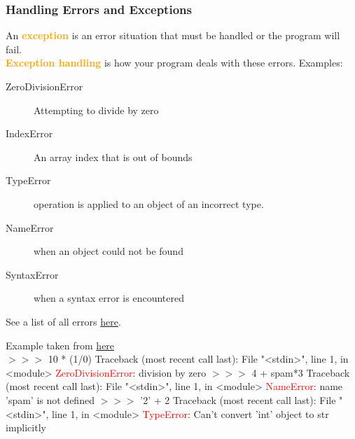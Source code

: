 \documentclass[xcolor=svgnames]{beamer}
\newcommand{\red}[1]{\textcolor{red}{#1}}
\newcommand{\nl}{\\[1em]}
\newcommand{\define}[1]{\textbf{\textcolor{orange}{#1}}}
\newcommand{\ft}[1]{\frametitle{#1}}
\newenvironment{allintypewriter}{\ttfamily}{\par}
\begin{document}

\begin{frame}\ft{Handling Errors and Exceptions}
An \define{exception} is an error situation that must be handled or the program will fail. \nl
\define{Exception handling} is how your program deals with these errors.
Examples:

\begin{description}
\item[ZeroDivisionError] Attempting to divide by zero
\item[IndexError] An array index that is out of bounds
\item[TypeError] operation is applied to an object of an incorrect type.
\item[NameError]  when an object could not be found
\item[SyntaxError] when a syntax error is encountered
\end{description}
See a list of all errors \href{https://www.tutorialsteacher.com/python/error-types-in-python}{here}.
\end{frame}

\begin{frame}[fragile]
Example taken from \href{https://docs.python.org/3/tutorial/errors.html}{here}\\
\begin{allintypewriter} { \small
$>>>$ 10 * (1/0)\newline
Traceback (most recent call last):\newline
  File "<stdin>", line 1, in <module>\newline
\red{ZeroDivisionError}: division by zero\newline
$>>>$ 4 + spam*3\newline
Traceback (most recent call last):\newline
  File "<stdin>", line 1, in <module>\newline
\red{NameError}: name 'spam' is not defined\newline
$>>>$ '2' + 2\newline
Traceback (most recent call last):\newline
  File "<stdin>", line 1, in <module>\newline
\red{TypeError}: Can't convert 'int' object to str implicitly}
\end{allintypewriter}

\end{frame}
\end{document}
